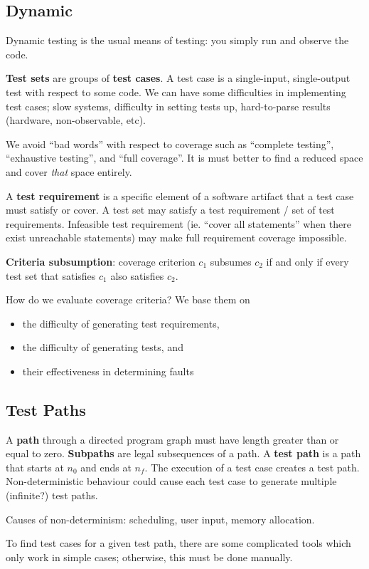 \documentclass[12pt]{article}
\begin{document}
\subsection{Dynamic}
Dynamic testing is the usual means of testing: you simply run and observe the code.

{\bf Test sets} are groups of {\bf test cases}. A test case is a single-input, single-output test with respect to some code. We can have some difficulties in implementing test cases; slow systems, difficulty in setting tests up, hard-to-parse results (hardware, non-observable, etc).

We avoid ``bad words'' with respect to coverage such as ``complete testing'', ``exhaustive testing'', and ``full coverage''. It is must better to find a reduced space and cover \emph{that} space entirely.

A {\bf test requirement} is a specific element of a software artifact that a test case must satisfy or cover. A test set may satisfy a test requirement / set of test requirements. Infeasible test requirement (ie. ``cover all statements'' when there exist unreachable statements) may make full requirement coverage impossible.

{\bf Criteria subsumption}: coverage criterion $c_1$ subsumes $c_2$ if and only if every test set that satisfies $c_1$ also satisfies $c_2$.

How do we evaluate coverage criteria? We base them on
\begin{itemize}
\item the difficulty of generating test requirements,
\item the difficulty of generating tests, and
\item their effectiveness in determining faults
\end{itemize}

\subsection{Test Paths}
A {\bf path} through a directed program graph must have length greater than or equal to zero. {\bf Subpaths} are legal subsequences of a path. A {\bf test path} is a path that starts at $n_0$ and ends at $n_f$. The execution of a test case creates a test path. Non-deterministic behaviour could cause each test case to generate multiple (infinite?) test paths.

Causes of non-determinism: scheduling, user input, memory allocation.

To find test cases for a given test path, there are some complicated tools which only work in simple cases; otherwise, this must be done manually.
\end{document}
